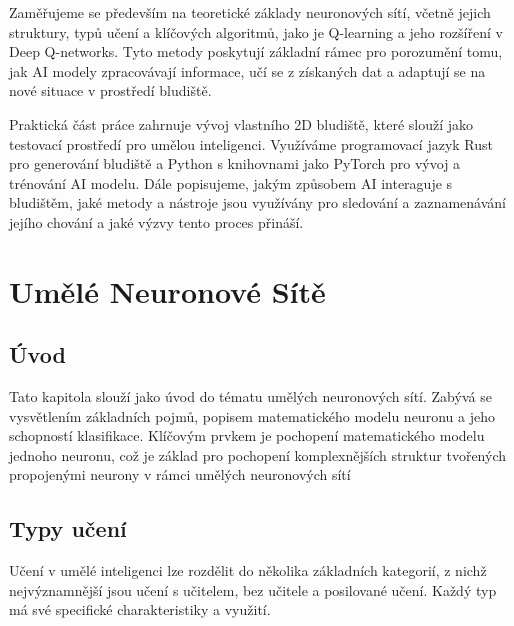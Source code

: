 \documentclass[12pt, a4paper,
twoside,        %
openright
]{report}
\begin{document}
Zaměřujeme se především na teoretické základy neuronových sítí, včetně jejich struktury, typů učení a klíčových algoritmů, jako je Q-learning a jeho rozšíření v Deep Q-networks. Tyto metody poskytují základní rámec pro porozumění tomu, jak AI modely zpracovávají informace, učí se z získaných dat a adaptují se na nové situace v prostředí bludiště.

Praktická část práce zahrnuje vývoj vlastního 2D bludiště, které slouží jako testovací prostředí pro umělou inteligenci. Využíváme programovací jazyk Rust pro generování bludiště a Python s knihovnami jako PyTorch pro vývoj a trénování AI modelu. Dále popisujeme, jakým způsobem AI interaguje s bludištěm, jaké metody a nástroje jsou využívány pro sledování a zaznamenávání jejího chování a jaké výzvy tento proces přináší.





\chapter{Umělé Neuronové Sítě}

\section{Úvod}
\label{sec:uvod}

Tato kapitola slouží jako úvod do tématu umělých neuronových sítí. Zabývá se vysvětlením základních pojmů, popisem matematického modelu neuronu a jeho schopností klasifikace. Klíčovým prvkem je pochopení matematického modelu jednoho neuronu, což je základ pro pochopení komplexnějších struktur tvořených propojenými neurony v rámci umělých neuronových sítí



\section{Typy učení}
\label{sec:prace_s_textem}
Učení v umělé inteligenci lze rozdělit do několika základních kategorií, z nichž nejvýznamnější jsou učení s učitelem, bez učitele a posilované učení. Každý typ má své specifické charakteristiky a využití.
\end{document}
